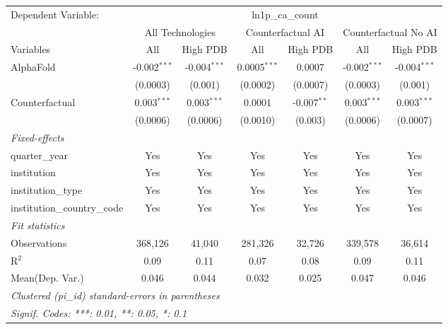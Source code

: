 \begingroup
\centering
\begin{tabular}{lcccccc}
   \tabularnewline \midrule \midrule
   Dependent Variable: & \multicolumn{6}{c}{ln1p\_ca\_count}\\
 & \multicolumn{2}{c}{All Technologies} & \multicolumn{2}{c}{Counterfactual AI} & \multicolumn{2}{c}{Counterfactual No AI} \\
\cmidrule(lr){1-1}\cmidrule(lr){2-3} \cmidrule(lr){4-5} \cmidrule(lr){6-7}
Variables & \multicolumn{1}{c}{All} & \multicolumn{1}{c}{High PDB} & \multicolumn{1}{c}{All} & \multicolumn{1}{c}{High PDB} & \multicolumn{1}{c}{All} & \multicolumn{1}{c}{High PDB} \\
\cmidrule(lr){1-1}\cmidrule(lr){2-2} \cmidrule(lr){3-3} \cmidrule(lr){4-4} \cmidrule(lr){5-5} \cmidrule(lr){6-6} \cmidrule(lr){7-7}
   AlphaFold                    & -0.002$^{***}$ & -0.004$^{***}$ & 0.0005$^{***}$ & 0.0007        & -0.002$^{***}$ & -0.004$^{***}$\\   
                                & (0.0003)       & (0.001)        & (0.0002)       & (0.0007)      & (0.0003)       & (0.001)\\   
   Counterfactual               & 0.003$^{***}$  & 0.003$^{***}$  & 0.0001         & -0.007$^{**}$ & 0.003$^{***}$  & 0.003$^{***}$\\   
                                & (0.0006)       & (0.0006)       & (0.0010)       & (0.003)       & (0.0006)       & (0.0007)\\   
   \midrule
   \emph{Fixed-effects}\\
   quarter\_year                & Yes            & Yes            & Yes            & Yes           & Yes            & Yes\\  
   institution                  & Yes            & Yes            & Yes            & Yes           & Yes            & Yes\\  
   institution\_type            & Yes            & Yes            & Yes            & Yes           & Yes            & Yes\\  
   institution\_country\_code   & Yes            & Yes            & Yes            & Yes           & Yes            & Yes\\  
   \midrule
   \emph{Fit statistics}\\
   Observations                 & 368,126        & 41,040         & 281,326        & 32,726        & 339,578        & 36,614\\  
   R$^2$                        & 0.09           & 0.11           & 0.07           & 0.08          & 0.09           & 0.11\\  
Mean(Dep. Var.) & 0.046 & 0.044 & 0.032 & 0.025 & 0.047 & 0.046 \\
   \midrule \midrule
   \multicolumn{7}{l}{\emph{Clustered (pi\_id) standard-errors in parentheses}}\\
   \multicolumn{7}{l}{\emph{Signif. Codes: ***: 0.01, **: 0.05, *: 0.1}}\\
\end{tabular}
\par\endgroup
